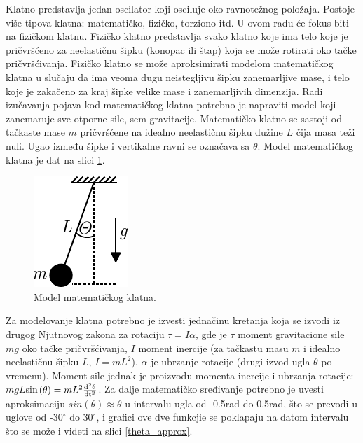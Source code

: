 \documentclass[a4paper, 12pt, diplomski]{etf}
\begin{document}
Klatno predstavlja jedan oscilator koji osciluje oko ravnotežnog položaja. Postoje više tipova klatna: matematičko, fizičko, torziono itd. U ovom radu će fokus biti na fizičkom klatnu. Fizičko klatno predstavlja svako klatno koje ima telo koje je pričvršćeno za neelastičnu šipku (konopac ili štap) koja se može rotirati oko tačke pričvršćivanja. Fizičko klatno se može aproksimirati modelom matematičkog klatna u slučaju da ima veoma dugu neistegljivu šipku zanemarljive mase, i telo koje je zakačeno za kraj šipke velike mase i zanemarljivih dimenzija. Radi izučavanja pojava kod matematičkog klatna potrebno je napraviti model koji zanemaruje sve otporne sile, sem gravitacije. Matematičko klatno se sastoji od tačkaste mase $m$ pričvršćene na idealno neelastičnu šipku dužine $L$ čija masa teži nuli. Ugao između šipke i vertikalne ravni se označava sa $\theta$. Model matematičkog klatna je dat na slici \ref{mat_klatno}.

\begin{figure}[h!]
    \centering
    \includegraphics[scale=1.5]{imgs_teorija/mat_klatno.pdf}
    \caption{Model matematičkog klatna.}
    \label{mat_klatno}
\end{figure}



\noindent
Za modelovanje klatna potrebno je izvesti jednačinu kretanja koja se izvodi iz drugog Njutnovog zakona za rotaciju $\tau = I \alpha$, gde je $\tau$ moment gravitacione sile $mg$ oko tačke pričvršćivanja, $I$ moment inercije (za tačkastu masu $m$ i idealno neelastičnu šipku $L$, $I = m L^2$), $\alpha$ je ubrzanje rotacije (drugi izvod ugla $\theta$ po vremenu). Moment sile jednak je proizvodu momenta inercije i ubrzanja rotacije: $mgL$sin$(\theta) = mL^2 \frac{\rm{d}^2 \theta}{\rm{d}t^2}$. Za dalje matematičko sređivanje potrebno je uvesti aproksimaciju $sin(\theta) \approx \theta$ u intervalu ugla od -0.5rad do 0.5rad, što se prevodi u uglove od -30$^\circ$ do 30$^\circ$, i grafici ove dve funkcjie se poklapaju na datom intervalu što se može i videti na slici \ref{theta_approx}. 
\end{document}
